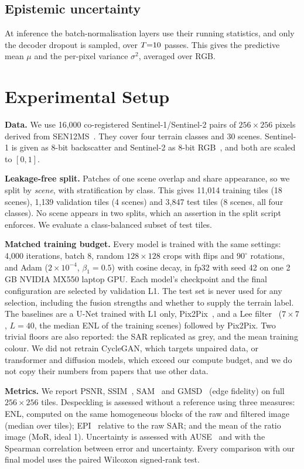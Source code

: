 \documentclass[conference]{IEEEtran}
\begin{document}
\subsection{Epistemic uncertainty}
At inference the batch-normalisation layers use their running statistics, and only the decoder dropout is sampled, over
$T{=}10$ passes. This gives the predictive mean $\mu$ and the per-pixel variance $\sigma^2$, averaged over RGB.

\section{Experimental Setup}
\textbf{Data.} We use 16{,}000 co-registered Sentinel-1/Sentinel-2 pairs of $256{\times}256$ pixels derived from
SEN12MS~\cite{schmitt2019sen12ms}. They cover four terrain classes and 30 scenes. Sentinel-1 is given as 8-bit backscatter and
Sentinel-2 as 8-bit RGB~\cite{drusch2012s2}, and both are scaled to $[0,1]$.

\textbf{Leakage-free split.} Patches of one scene overlap and share appearance, so we split by \emph{scene}, with
stratification by class. This gives 11{,}014 training tiles (18 scenes), 1{,}139 validation tiles (4 scenes) and 3{,}847 test
tiles (8 scenes, all four classes). No scene appears in two splits, which an assertion in the split script enforces. We evaluate
a class-balanced subset of \nTest{} test tiles.

\textbf{Matched training budget.} Every model is trained with the same settings: 4{,}000 iterations, batch 8, random
$128{\times}128$ crops with flips and $90^\circ$ rotations, and Adam ($2{\times}10^{-4}$, $\beta_1{=}0.5$) with cosine decay,
in fp32 with seed 42 on one 2\,GB NVIDIA MX550 laptop GPU. Each model's checkpoint and the final configuration are selected by
validation L1. The test set is never used for any selection, including the fusion strengths and whether to supply the terrain
label. The baselines are a U-Net trained with L1 only, Pix2Pix~\cite{isola2017pix2pix}, and a Lee filter~\cite{lee1980filter}
($7{\times}7$, $L{=}40$, the median ENL of the training scenes) followed by Pix2Pix. Two trivial floors are also reported: the SAR
replicated as grey, and the mean training colour. We did not retrain CycleGAN, which targets unpaired data, or transformer and
diffusion models, which exceed our compute budget, and we do not copy their numbers from papers that use other data.

\textbf{Metrics.} We report PSNR, SSIM~\cite{wang2004ssim}, SAM~\cite{kruse1993sam} and GMSD~\cite{xue2014gmsd} (edge
fidelity) on full $256{\times}256$ tiles. Despeckling is assessed without a reference using three measures: ENL, computed on the
same homogeneous blocks of the raw and filtered image (median over tiles); EPI~\cite{sattar1997epi} relative to the raw SAR; and
the mean of the ratio image (MoR, ideal 1). Uncertainty is assessed with AUSE~\cite{ilg2018uncertainty} and with the Spearman
correlation between error and uncertainty. Every comparison with our final model uses the paired Wilcoxon signed-rank test.
\end{document}
